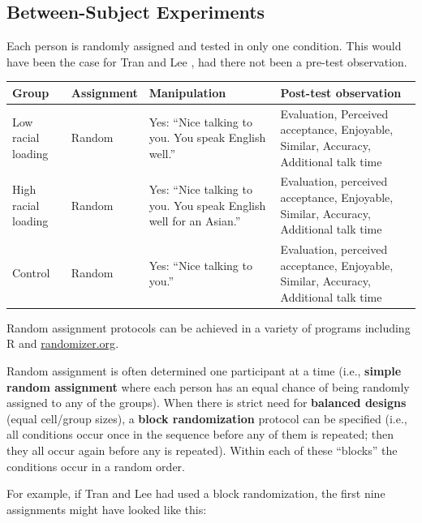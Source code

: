 \documentclass[
  english,
]{book}
\begin{document}
\hypertarget{between-subject-experiments}{%
\subsection{Between-Subject Experiments}\label{between-subject-experiments}}

Each person is randomly assigned and tested in only one condition. This would have been the case for Tran and Lee \citeyearpar{tran_you_2014}, had there not been a pre-test observation.

\begin{longtable}[]{@{}
  >{\raggedright\arraybackslash}p{}
  >{\raggedright\arraybackslash}p{}
  >{\raggedright\arraybackslash}p{}
  >{\raggedright\arraybackslash}p{}@{}}
\toprule
Group & Assignment & Manipulation & Post-test observation \\
\midrule
\endhead
Low racial loading & Random & Yes: ``Nice talking to you. You speak English well.'' & Evaluation, Perceived acceptance, Enjoyable, Similar, Accuracy, Additional talk time \\
High racial loading & Random & Yes: ``Nice talking to you. You speak English well for an Asian.'' & Evaluation, perceived acceptance, Enjoyable, Similar, Accuracy, Additional talk time \\
Control & Random & Yes: ``Nice talking to you.'' & Evaluation, perceived acceptance, Enjoyable, Similar, Accuracy, Additional talk time \\
\bottomrule
\end{longtable}

Random assignment protocols can be achieved in a variety of programs including R and \href{https://www.randomizer.org/}{randomizer.org}.

Random assignment is often determined one participant at a time (i.e., \textbf{simple random assignment} where each person has an equal chance of being randomly assigned to any of the groups). When there is strict need for \textbf{balanced designs} (equal cell/group sizes), a \textbf{block randomization} protocol can be specified (i.e., all conditions occur once in the sequence before any of them is repeated; then they all occur again before any is repeated). Within each of these ``blocks'' the conditions occur in a random order.

For example, if Tran and Lee had used a block randomization, the first nine assignments might have looked like this:
\end{document}
